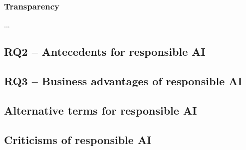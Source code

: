 \subsubsection{Transparency}
...
  



\subsection{RQ2 -- Antecedents for responsible AI}

\subsection{RQ3 -- Business advantages of responsible AI}



\subsection{Alternative terms for responsible AI}
\label{sec:results-alernative-terms}

\subsection{Criticisms of responsible AI}
\label{sec:results-criticism}
